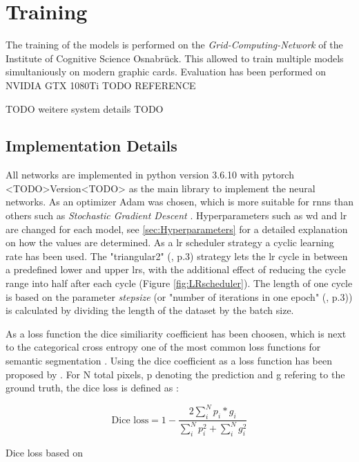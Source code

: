 \documentclass[11pt,
  paper=a4, 
  bibliography=totocnumbered,
	captions=tableheading,
	BCOR=10mm
]{scrreprt}
\theoremstyle{definition}
\newcommand{\figref}[1]{(Figure \ref{#1})}
\newcommand\slcaption[1]{\setsepchar{.}\readlist*\pdots{#1}\caption[{\pdots[1].}]{#1}}
\begin{document}
\section{Training}
The training of the models is performed on the \textit{Grid-Computing-Network} of the Institute of Cognitive Science Osnabrück.
This allowed to train multiple models simultaniously on modern graphic cards. Evaluation has been performed on NVIDIA GTX 1080Ti TODO REFERENCE

TODO weitere system details TODO

\subsection{Implementation Details}
All networks are implemented in python version 3.6.10 with pytorch <TODO>Version<TODO> as the main library to implement the neural networks.
As an optimizer Adam \cite{Kingma2015} was chosen, which is more suitable for \glspl{rnn} than others such as \textit{Stochastic Gradient Descent} \cite{Pfeuffer2020}.
Hyperparameters such as \gls{wd} and \gls{lr} are changed for each model, see \ref{sec:Hyperparameters} for a detailed explanation on how the values are determined.
As a \gls{lr} scheduler strategy a cyclic learning rate has been used.
The "triangular2" (\cite{Smith2017}, p.3) strategy lets the \gls{lr} cycle in between a predefined lower and upper \glspl{lr}, with the additional effect of reducing the cycle range into half after each cycle \figref{fig:LRscheduler}.
The length of one cycle is based on the parameter \textit{stepsize} (or "number of iterations in one epoch" (\cite{Smith2017}, p.3)) is calculated by dividing the length of the dataset by the batch size.

As a loss function the dice similiarity coefficient has been choosen, which is next to the categorical cross entropy one of the most common loss functions for semantic segmentation \cite{Garcia-Garcia2018}.
Using the dice coefficient as a loss function has been proposed by \textcite{Milletari2016}.
For N total pixels, p denoting the prediction and g refering to the ground truth, the dice loss is defined as \cite{Milletari2016}:
\begin{equ}[H]
	\begin{equation}
		\text{Dice loss} = 1 - \frac{2\sum_{i}^{N}p_i*g_i}{\sum_{i}^{N}p_i^2 + \sum_{i}^{N}g_i^2}
	\end{equation}
	\caption[Dice Loss]{Dice loss based on \textcite{Milletari2016}}
\end{equ}
\end{document}
